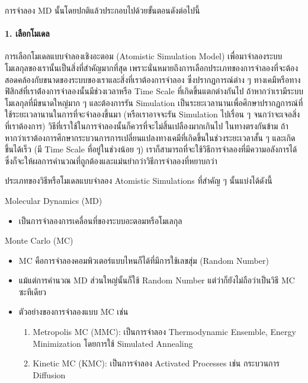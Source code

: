 การจำลอง MD นั้นโดยปกติแล้วประกอบไปด้วยขั้นตอนดังต่อไปนี้

\paragraph{1. เลือกโมเดล}

การเลือกโมเดลแบบจำลองเชิงอะตอม (Atomistic Simulation Model) เพื่อมาจำลองระบบโมเลกุลของเรานั้นเป็นสิ่งที่สำคัญมากที่สุด 
เพราะนั่นหมายถึงการเลือกประเภทของการจำลองที่จะต้องสอดคล้องกับขนาดของระบบของเราและสิ่งที่เราต้องการจำลอง ซึ่งปรากฏการณ์ต่าง ๆ 
ทางเคมีหรือทางฟิสิกส์ที่เราต้่องการจำลองนั้นมีช่วงเวลาหรือ Time Scale ที่เกิดขึ้นแตกต่างกันไป ถ้าหากว่าเรามีระบบโมเลกุลที่มีขนาดใหญ่มาก ๆ 
และต้องการรัน Simulation เป็นระยะเวลานานเพื่อศึกษาปรากฏการณ์ที่ใช้ระยะเวลานานในการที่จะจำลองขึ้นมา (หรือเราอาจจะรัน Simulation 
ไปเรื่อน ๆ จนกว่าจะเจอสิ่งที่เราต้องการ) วิธีที่เราใช้ในการจำลองนั้นก็ควรที่จะไม่สิ้นเปลืองมากเกินไป 
%
ในทางตรงกันข้าม ถ้าหากว่าเราต้องการศึกษากระบวนการการเปลี่ยนแปลงทางเคมีที่เกิดขึ้นในช่วงระยะเวลาสั้น ๆ และเกิดขึ้นได้เร็ว (มี Time Scale 
ที่อยู่ในช่วงน้อย ๆ) เราก็สามารถที่จะใช้วิธีการจำลองที่มีความอลังการได้ ซึ่งก็จะให้ผลการคำนวณที่ถูกต้องและแม่นยำกว่าวิธีการจำลองที่หยาบกว่า

ประเภทของวิธีหรือโมเดลแบบจำลอง Atomistic Simulations ที่สำคัญ ๆ นั้นแบ่งได้ดังนี้

Molecular Dynamics (MD)
\begin{itemize}[topsep=0pt,noitemsep]
  \setlength\itemsep{0.5em}
  \item เป็นการจำลองการเคลื่อนที่ของระบบอะตอมหรือโมเลกุล
\end{itemize}

Monte Carlo (MC)
\begin{itemize}[topsep=0pt,noitemsep]
  \setlength\itemsep{0.5em}
  \item MC คือการจำลองคอมพิวเตอร์แบบไหนก็ได้ที่มีการใช้เลขสุ่ม (Random Number) 

  \item แม้แต่การคำนวณ MD ส่วนใหญ่นั้นก็ใช้ Random Number แต่ว่าก็ยังไม่ถือว่าเป็นวิธี MC ซะทีเดียว

  \item ตัวอย่างของการจำลองแบบ MC เช่น
  \begin{enumerate}[topsep=0pt,noitemsep]
    \setlength\itemsep{0.5em}

    \item Metropolis MC (MMC): เป็นการจำลอง Thermodynamic Ensemble, Energy Minimization  โดยการใช้ Simulated 
    Annealing
    
    \item Kinetic MC (KMC): เป็นการจำลอง Activated Processes เช่น กระบวนการ Diffusion
  \end{enumerate}
\end{itemize}

